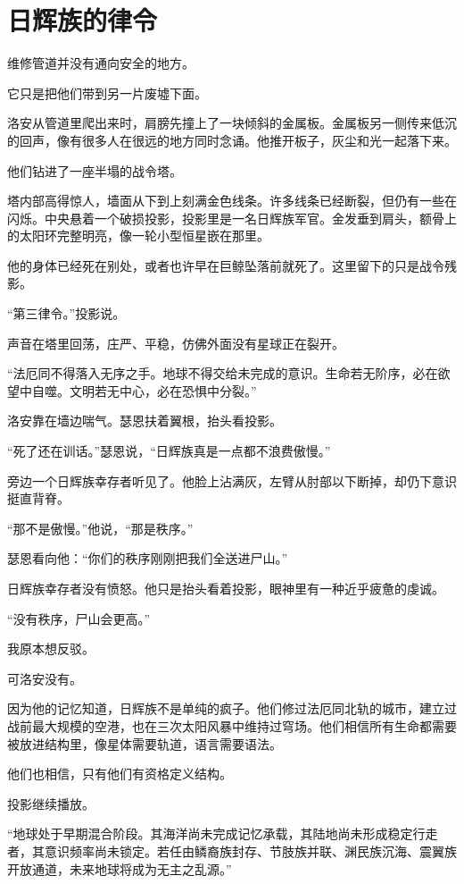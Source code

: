 \chapter{日辉族的律令}

维修管道并没有通向安全的地方。

它只是把他们带到另一片废墟下面。

洛安从管道里爬出来时，肩膀先撞上了一块倾斜的金属板。金属板另一侧传来低沉的回声，像有很多人在很远的地方同时念诵。他推开板子，灰尘和光一起落下来。

他们钻进了一座半塌的战令塔。

塔内部高得惊人，墙面从下到上刻满金色线条。许多线条已经断裂，但仍有一些在闪烁。中央悬着一个破损投影，投影里是一名日辉族军官。金发垂到肩头，额骨上的太阳环完整明亮，像一轮小型恒星嵌在那里。

他的身体已经死在别处，或者也许早在巨鲸坠落前就死了。这里留下的只是战令残影。

“第三律令。”投影说。

声音在塔里回荡，庄严、平稳，仿佛外面没有星球正在裂开。

“法厄同不得落入无序之手。地球不得交给未完成的意识。生命若无阶序，必在欲望中自噬。文明若无中心，必在恐惧中分裂。”

洛安靠在墙边喘气。瑟恩扶着翼根，抬头看投影。

“死了还在训话。”瑟恩说，“日辉族真是一点都不浪费傲慢。”

旁边一个日辉族幸存者听见了。他脸上沾满灰，左臂从肘部以下断掉，却仍下意识挺直背脊。

“那不是傲慢。”他说，“那是秩序。”

瑟恩看向他：“你们的秩序刚刚把我们全送进尸山。”

日辉族幸存者没有愤怒。他只是抬头看着投影，眼神里有一种近乎疲惫的虔诚。

“没有秩序，尸山会更高。”

我原本想反驳。

可洛安没有。

因为他的记忆知道，日辉族不是单纯的疯子。他们修过法厄同北轨的城市，建立过战前最大规模的空港，也在三次太阳风暴中维持过穹场。他们相信所有生命都需要被放进结构里，像星体需要轨道，语言需要语法。

他们也相信，只有他们有资格定义结构。

投影继续播放。

“地球处于早期混合阶段。其海洋尚未完成记忆承载，其陆地尚未形成稳定行走者，其意识频率尚未锁定。若任由鳞裔族封存、节肢族并联、渊民族沉海、震翼族开放通道，未来地球将成为无主之乱源。”

